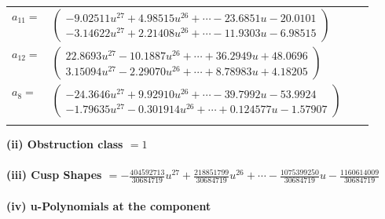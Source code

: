 \documentclass[1p]{elsarticle_modified}
\theoremstyle{definition}
\begin{document}
\begin{tabular}{m{7pt} m{180pt} m{7pt} m{180pt} }
\flushright $a_{11}=$&$\begin{pmatrix}-9.02511 u^{27}+4.98515 u^{26}+\cdots-23.6851 u-20.0101\\-3.14622 u^{27}+2.21408 u^{26}+\cdots-11.9303 u-6.98515\end{pmatrix}$ \\
\flushright $a_{12}=$&$\begin{pmatrix}22.8693 u^{27}-10.1887 u^{26}+\cdots+36.2949 u+48.0696\\3.15094 u^{27}-2.29070 u^{26}+\cdots+8.78983 u+4.18205\end{pmatrix}$ \\
\flushright $a_{8}=$&$\begin{pmatrix}-24.3646 u^{27}+9.92910 u^{26}+\cdots-39.7992 u-53.9924\\-1.79635 u^{27}-0.301914 u^{26}+\cdots+0.124577 u-1.57907\end{pmatrix}$\\&\end{tabular}
\flushleft \textbf{(ii) Obstruction class $= 1$}\\~\\
\flushleft \textbf{(iii) Cusp Shapes $= -\frac{404592713}{30684719} u^{27}+\frac{218851799}{30684719} u^{26}+\cdots-\frac{1075399250}{30684719} u-\frac{1160614009}{30684719}$}\\~\\
\newpage\renewcommand{\arraystretch}{1}
\flushleft \textbf{(iv) u-Polynomials at the component}\newline \\
\end{document}
